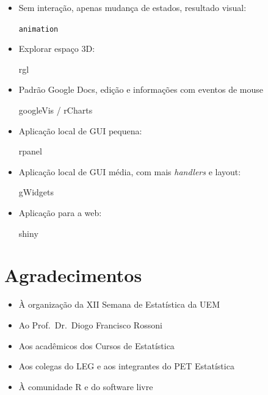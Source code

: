\begin{frame}

  \begin{multicols}{2}
    \begin{itemize}
      \pause \item Sem interação, apenas mudança de estados, resultado
      visual: \pause
      \begin{center}
        \texttt{animation}
      \end{center}
      \pause \item Explorar espaço 3D: \pause
      \begin{center}
        rgl
      \end{center}
      \pause \item Padrão Google Docs, edição e informações com eventos
      de mouse \pause
      \begin{center}
        googleVis / rCharts
      \end{center}
      \vfill \columnbreak \pause \item Aplicação local de GUI pequena:
      \pause
      \begin{center}
        rpanel
      \end{center}
      \pause \item Aplicação local de GUI média, com mais
      \textit{handlers} e layout: \pause
      \begin{center}
        gWidgets
      \end{center}
      \pause \item Aplicação para a web: \pause
      \begin{center}
        shiny
      \end{center}
    \end{itemize}
  \end{multicols}

\end{frame}

\section{Agradecimentos}

\begin{frame}

  \begin{itemize}
  \item À organização da XII Semana de Estatística da UEM
  \item Ao Prof.~Dr.~Diogo Francisco Rossoni
  \item Aos acadêmicos dos Cursos de Estatística
  \item Aos colegas do LEG e aos integrantes do PET Estatística
  \item À comunidade R e do software livre
  \end{itemize}

\end{frame}

